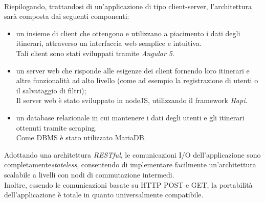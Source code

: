\documentclass[11pt]{report}
\begin{document}
\\
Riepilogando, trattandosi di un'applicazione di tipo client-server, l'architettura sarà composta dai seguenti componenti:
\begin{itemize}
	\item un insieme di client che ottengono e utilizzano a piacimento i dati degli itinerari, attraverso un interfaccia web semplice e intuitiva.
		  \\Tali client sono stati sviluppati tramite \textit{Angular 5}.
	\item un server web che risponde alle esigenze dei client fornendo loro itinerari e altre funzionalità ad alto livello (come ad esempio la registrazione di utenti o il salvataggio di filtri);
	\\Il server web è stato sviluppato in nodeJS, utilizzando il framework \textit{Hapi}.
	\item un database relazionale in cui mantenere i dati degli utenti e gli itinerari ottenuti tramite scraping.
	\\Come DBMS è stato utilizzato MariaDB.
\end{itemize}
Adottando una architettura \textit{RESTful}, le comunicazioni I/O dell'applicazione sono completamente\textit{stateless}, consentendo di implementare facilmente un'architettura scalabile a livelli con nodi di commutazione intermedi.
\\Inoltre, essendo le comunicazioni basate su HTTP POST e GET, la portabilità dell'applicazione è totale in quanto universalmente compatibile.

\pagebreak
\end{document}
